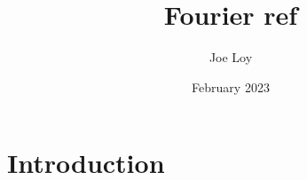 \documentclass{article}
\title{Fourier ref}
\author{Joe Loy}
\date{February 2023}
\begin{document}
\maketitle

\section{Introduction}
\end{document}
